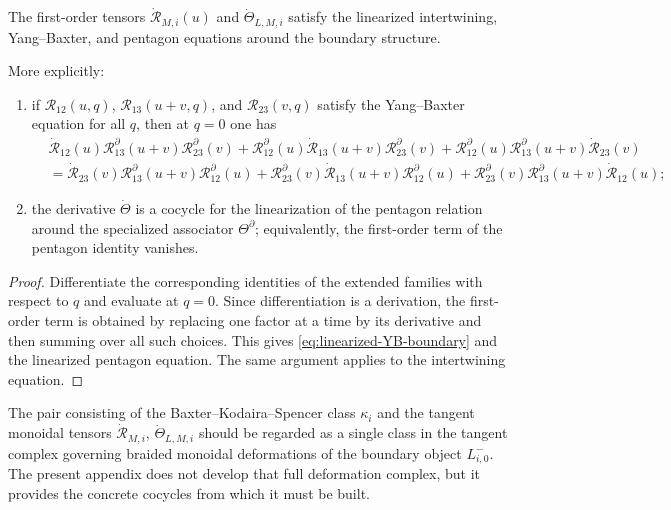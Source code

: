\begin{theorem}
\ClaimStatusProvedHere
\label{thm:linearized-boundary-equations}
The first-order tensors
$\dot{\mathscr R}_{M,i}(u)$ and $\dot\Theta_{L,M,i}$ satisfy the
linearized intertwining, Yang--Baxter, and pentagon equations around the
boundary structure.

More explicitly:
\begin{enumerate}
    \item if $\mathscr R_{12}(u,q)$,
    $\mathscr R_{13}(u+v,q)$, and $\mathscr R_{23}(v,q)$ satisfy the
    Yang--Baxter equation for all $q$, then at $q=0$ one has
    \begin{align}
    &\dot{\mathscr R}_{12}(u)
    \mathscr R^{\partial}_{13}(u+v)
    \mathscr R^{\partial}_{23}(v)
    +
    \mathscr R^{\partial}_{12}(u)
    \dot{\mathscr R}_{13}(u+v)
    \mathscr R^{\partial}_{23}(v)
    +
    \mathscr R^{\partial}_{12}(u)
    \mathscr R^{\partial}_{13}(u+v)
    \dot{\mathscr R}_{23}(v)
    \nonumber\\
    &=
    \dot{\mathscr R}_{23}(v)
    \mathscr R^{\partial}_{13}(u+v)
    \mathscr R^{\partial}_{12}(u)
    +
    \mathscr R^{\partial}_{23}(v)
    \dot{\mathscr R}_{13}(u+v)
    \mathscr R^{\partial}_{12}(u)
    +
    \mathscr R^{\partial}_{23}(v)
    \mathscr R^{\partial}_{13}(u+v)
    \dot{\mathscr R}_{12}(u);
    \label{eq:linearized-YB-boundary}
    \end{align}
    \item the derivative $\dot\Theta$ is a cocycle for the linearization
    of the pentagon relation around the specialized associator
    $\Theta^{\partial}$; equivalently, the first-order term of the
    pentagon identity vanishes.
\end{enumerate}
\end{theorem}

\begin{proof}
Differentiate the corresponding identities of the extended families with
respect to $q$ and evaluate at $q=0$.  Since differentiation is a
derivation, the first-order term is obtained by replacing one factor at a
time by its derivative and then summing over all such choices.  This gives
\eqref{eq:linearized-YB-boundary} and the linearized pentagon equation.
The same argument applies to the intertwining equation.
\end{proof}

\begin{remark}
\label{rem:boundary-deformation-complex}
The pair consisting of the Baxter--Kodaira--Spencer class $\kappa_i$ and
the tangent monoidal tensors $\dot{\mathscr R}_{M,i}$,
$\dot\Theta_{L,M,i}$ should be regarded as a single class in the tangent
complex governing braided monoidal deformations of the boundary object
$L^-_{i,0}$.  The present appendix does not develop that full deformation
complex, but it provides the concrete cocycles from which it must be
built.
\end{remark}


